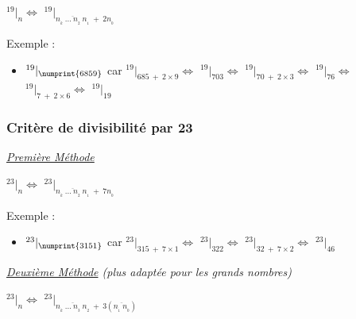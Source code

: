 \documentclass[a4paper, twoside]{article}
\begin{document}
	\begin{center}
		\huge
		$ ^{19}|_n \Leftrightarrow$ $^{19}|_{\overline{n_{_{k}}~\dots~n_{_2}~n_{_1}}~+~2n_{_0}} $
	\end{center}

	{ \parindent=0.5cm Exemple : }

	\begin{large}
	\begin{itemize}

		\item[] $ ^{19}|_{\numprint{6859}}$ {\normalsize car} $^{19}|_{685~+~2\times9} \Leftrightarrow$ $^{19}|_{703} \Leftrightarrow$ $^{19}|_{70~+~2\times3} \Leftrightarrow$ $^{19}|_{76} \Leftrightarrow$ $^{19}|_{7~+~2\times6} \Leftrightarrow$ $^{19}|_{19}$\\

	\end{itemize}
	\end{large}


	\vfill
	{\noindent \dotfill}


	\subsubsection*{Critère de divisibilité par 23}

	{\noindent  \underline{\textit{Première Méthode}}}	

	\begin{center}
		\huge
		$ ^{23}|_n \Leftrightarrow$ $^{23}|_{\overline{n_{_{k}}~\dots~n_{_2}~n_{_1}}~+~7n_{_0}} $
	\end{center}

	{ \parindent=0.5cm Exemple : }

	\begin{Large}
	\begin{itemize}

		\item[] $ ^{23}|_{\numprint{3151}}$ {\normalsize car} $^{23}|_{315~+~7\times1} \Leftrightarrow$ $^{23}|_{322} \Leftrightarrow$ $^{23}|_{32~+~7\times2} \Leftrightarrow$ $^{23}|_{46}$\\

	\end{itemize}
	\end{Large}





	{\noindent  \textit{\underline{Deuxième Méthode} (plus adaptée pour les grands nombres)}}

	\begin{center}
		\huge
		$ ^{23}|_n \Leftrightarrow$ $^{23}|_{\overline{n_{_{k}}~\dots~n_{_3}~n_{_2}}~+~3\left(\overline{n_{_1}~n_{_0}}\right)} $
	\end{center}
\end{document}
